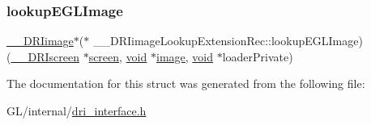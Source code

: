 \mbox{\label{struct_____d_r_iimage_lookup_extension_rec_a030f03ac2d3f52e13dc1ff3ecba753cf}} 
\subsubsection{\texorpdfstring{lookup\+E\+G\+L\+Image}{lookupEGLImage}}
{\footnotesize\ttfamily \hyperlink{dri__interface_8h_a37e0407153595dc88fe5d25127645cf1}{\+\_\+\+\_\+\+D\+R\+Iimage}$\ast$($\ast$ \+\_\+\+\_\+\+D\+R\+Iimage\+Lookup\+Extension\+Rec\+::lookup\+E\+G\+L\+Image) (\hyperlink{dri__interface_8h_a9961b01d421ee1fd6ed3c05acc9ca561}{\+\_\+\+\_\+\+D\+R\+Iscreen} $\ast$\hyperlink{cad_8h_ae04e09e4e3831bfc1632c509ae37dcec}{screen}, \hyperlink{_s_d_l__opengles2__gl2ext_8h_ae5d8fa23ad07c48bb609509eae494c95}{void} $\ast$\hyperlink{gl_8h_a0a221b005894579fea3b9eb7bfc2ee71}{image}, \hyperlink{_s_d_l__opengles2__gl2ext_8h_ae5d8fa23ad07c48bb609509eae494c95}{void} $\ast$loader\+Private)}



The documentation for this struct was generated from the following file\+:\begin{DoxyCompactItemize}
\item 
G\+L/internal/\hyperlink{dri__interface_8h}{dri\+\_\+interface.\+h}\end{DoxyCompactItemize}
